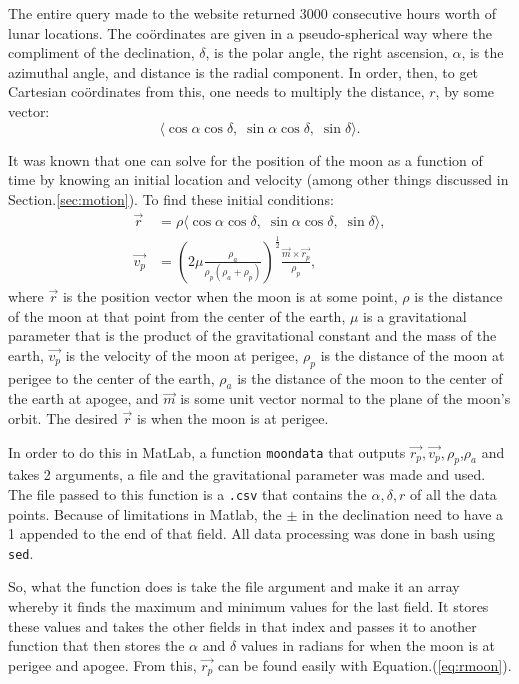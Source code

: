 \documentclass{article}
\begin{document}
The entire query made to the website returned 3000 consecutive hours worth
of lunar locations.
The co\"ordinates are given in a pseudo-spherical way where the
compliment of the declination, $\delta$, is the polar angle, the right
ascension, $\alpha$, is the azimuthal angle, and distance is the radial
component. In order, then, to get Cartesian co\"ordinates from this,
one needs to multiply the distance, $r$, by some vector:
\begin{equation}
  \langle \cos{\alpha}\cos{\delta}, \; \sin{\alpha}\cos{\delta}, \;
  \sin{\delta} \rangle.
\end{equation}

It was known that one can solve for the position of the moon as a
function of time by knowing an initial location and velocity (among
other things discussed in Section.\ref{sec:motion}). To find these initial conditions:
\begin{align}
  \vec{r} &= \rho \langle \cos{\alpha}\cos{\delta}, \;
  \sin{\alpha}\cos{\delta}, \; \sin{\delta} \rangle
  \label{eq:rmoon}, \\
  \vec{v_p} &=
  (2\mu\frac{\rho_a}{\rho_p(\rho_a+\rho_p)})^{\frac{1}{2}}
  \frac{\vec{m}\times\vec{r_p}}{\rho_p},
\end{align}
where $\vec{r}$ is the position vector when the moon is at some point,
$\rho$ is the distance of the moon at that point from the center of
the earth,
$\mu$ is a gravitational parameter that
is the product of the gravitational constant and the mass of the
earth, $\vec{v_p}$ is the velocity of the moon at perigee,
$\rho_p$ is the distance of the moon at perigee to the center
of the earth, $\rho_a$ is the distance of the moon to the center of the earth
at apogee, and $\vec{m}$ is some unit vector normal to the plane of the
moon's orbit. The desired $\vec{r}$ is when the moon is at perigee.

In order to do this in MatLab, a function \verb[moondata[ that
outputs $\vec{r_p}, \vec{v_p}, \rho_p$,$\rho_a$ and takes 2 arguments,
a file and the gravitational parameter was made and used.
The file passed to this function
is a \verb[.csv[ that contains the $\alpha,\delta,r$ of all the
data points. Because of limitations in Matlab, the $\pm$ in the
declination need to have a 1 appended to the end of that field. All
data processing was done in bash using \verb[sed[.

So, what the function does is take the file argument and make it an
array whereby it finds the maximum and minimum values for the last
field. It stores these values and takes the other fields in that index
and passes it to another function that then stores the $\alpha$ and
$\delta$ values in radians for when the moon is at perigee and apogee.
From this, $\vec{r_p}$ can be found easily with Equation.(\ref{eq:rmoon}).
\end{document}

